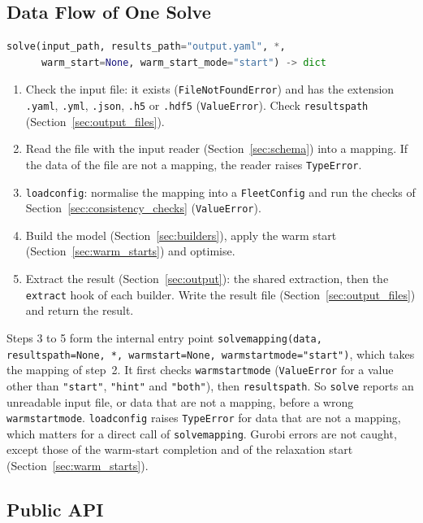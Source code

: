 \documentclass[11pt,a4paper]{article}
\theoremstyle{plain}
\theoremstyle{definition}
\renewcommand{\_}{\textunderscore\allowbreak{}}
\begin{document}
\subsection{Data Flow of One Solve}
\label{sec:data_flow}

\begin{lstlisting}[language=Python]
solve(input_path, results_path="output.yaml", *,
      warm_start=None, warm_start_mode="start") -> dict
\end{lstlisting}
\begin{enumerate}[nosep,label=\arabic*.]
  \item Check the input file: it exists (\texttt{FileNotFoundError}) and has the extension \texttt{.yaml}, \texttt{.yml}, \texttt{.json}, \texttt{.h5} or \texttt{.hdf5} (\texttt{ValueError}). Check \texttt{results\_path} (Section~\ref{sec:output_files}).
  \item Read the file with the input reader (Section~\ref{sec:schema}) into a mapping. If the data of the file are not a mapping, the reader raises \texttt{TypeError}.
  \item \texttt{load\_config}: normalise the mapping into a \texttt{FleetConfig} and run the checks of Section~\ref{sec:consistency_checks} (\texttt{ValueError}).
  \item Build the model (Section~\ref{sec:builders}), apply the warm start (Section~\ref{sec:warm_starts}) and optimise.
  \item Extract the result (Section~\ref{sec:output}): the shared extraction, then the \texttt{extract} hook of each builder. Write the result file (Section~\ref{sec:output_files}) and return the result.
\end{enumerate}
Steps 3 to 5 form the internal entry point \texttt{solve\_mapping(data, results\_path=None, *, warm\_start=None, warm\_start\_mode="start")}, which takes the mapping of step~2. It first checks \texttt{warm\_start\_mode} (\texttt{ValueError} for a value other than \texttt{"start"}, \texttt{"hint"} and \texttt{"both"}), then \texttt{results\_path}. So \texttt{solve} reports an unreadable input file, or data that are not a mapping, before a wrong \texttt{warm\_start\_mode}. \texttt{load\_config} raises \texttt{TypeError} for data that are not a mapping, which matters for a direct call of \texttt{solve\_mapping}. Gurobi errors are not caught, except those of the warm-start completion and of the relaxation start (Section~\ref{sec:warm_starts}).

\subsection{Public API}
\label{sec:api}
\end{document}

